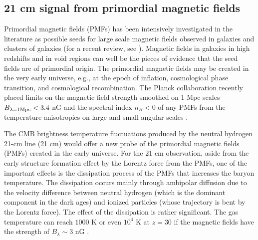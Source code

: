 \documentclass{PoS}
\begin{document}
\subsection{21 cm signal from primordial magnetic fields}

Primordial magnetic fields (PMFs) has been intensively investigated in
the literature as possible seeds for large scale magnetic fields
observed in galaxies and clusters of galaxies (for a recent review, see
\citep{2013A&ARv..21...62D}).  Magnetic fields in galaxies in high
redshifts \citep{2008Natur.454..302B} and in void regions
\citep{2010Sci...328...73N,2010ApJ...722L..39A,2013ApJ...771L..42T} can
well be the pieces of evidence that the seed fields are of primordial
origin.  The primordial magnetic fields may be created in the very
early universe, e.g., at the epoch of inflation, cosmological phase
transition, and cosmological recombination.  
The Planck collaboration
recently placed limits on the magnetic field strength smoothed on 1 Mpc scales $B_{\lambda=1{\rm Mpc}} < 3.4$ nG and the spectral index $n_B<0$ of any PMFs
from the temperature anisotropies on large and small angular scales
\citep{2013arXiv1303.5076P}. 

The CMB brightness temperature fluctuations produced by the neutral
hydrogen 21-cm line (21 cm) would offer a new probe of the primordial
magnetic fields (PMFs) created in the early universe. For the 21 cm
observation, aside from the early structure formation effect by the
Lorentz force from the PMFs, one of the important effects is the
dissipation process of the PMFs that increases the baryon
temperature. The dissipation occurs mainly through ambipolar
diffusion due to the velocity difference between neutral hydrogen (which
is the dominant component in the dark ages) and ionized particles (whose
trajectory is bent by the Lorentz force).  The effect of the dissipation
is rather significant. The gas temperature can reach $1000$ K or even
$10^4$ K at $z=30$ if the magnetic fields have the strength of
$B_\lambda \sim 3$ nG
\citep{2005MNRAS.356..778S,2006MNRAS.372.1060T,2009ApJ...692..236S,2014JCAP...01..009K}.
\end{document}
